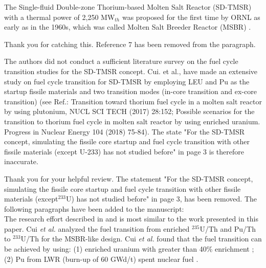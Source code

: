 \documentclass[answers,11pt]{exam}
\begin{document}
\begin{questions}
\begin{solution}
                 The Single-fluid Double-zone Thorium-based Molten Salt Reactor (SD-TMSR) with a thermal power of 2,250
                 MW$_{th}$ was proposed for the first time by ORNL as early as 
                 in the 1960s, which was called Molten Salt Breeder Reactor 
                 (MSBR) \cite{robertson_conceptual_1971}.
                 
                 Thank you for catching this. Reference 7 has been removed from the paragraph.
                 
        \end{solution}


        \question The authors did not conduct a sufficient literature survey on the fuel cycle transition studies for the SD-TMSR concept. Cui. et al., have made an extensive study on fuel cycle transition for SD-TMSR by employing LEU and Pu as the startup fissile materials and two transition modes (in-core transition and ex-core transition) (see Ref.: Transition toward thorium fuel cycle in a molten salt reactor by using plutonium, NUCL SCI TECH (2017) 28:152; Possible scenarios for the transition to thorium fuel cycle in molten salt reactor by using enriched uranium. Progress in Nuclear Energy 104 (2018) 75-84). The state "For the SD-TMSR concept, simulating the fissile core startup and fuel cycle transition with other fissile materials (except U-233) has not studied before" in page 3 is therefore inaccurate.
        \begin{solution}
                Thank you for your helpful review. The statement "For the SD-TMSR 
                concept, simulating the fissile core startup and fuel cycle 
                transition with other fissile materials (except$^{233}$U) has 
                not studied before" in page 3, has been removed. 
                The following paragraphs have been added to the manuscript:\\
                
                The research effort described in \cite{cui2017transition} and
                \cite{cui2018possible} is most similar to the work
                presented in this paper. Cui \emph{et al.} analyzed the fuel 
                transition from 
                enriched $^{235}$U/Th and Pu/Th to $^{233}$U/Th for the 
                MSBR-like design. Cui 
                \emph{et al.} found that the fuel transition can be achieved 
                by using: (1) 
                enriched uranium with greater than 40\% enrichment 
                \cite{cui2018possible}; (2) 
                Pu from LWR (burn-up of 60 GWd/t) spent nuclear fuel 
                \cite{cui2017transition, 
                	cui2018possible}.
                

\end{solution}
\end{questions}
\end{document}
